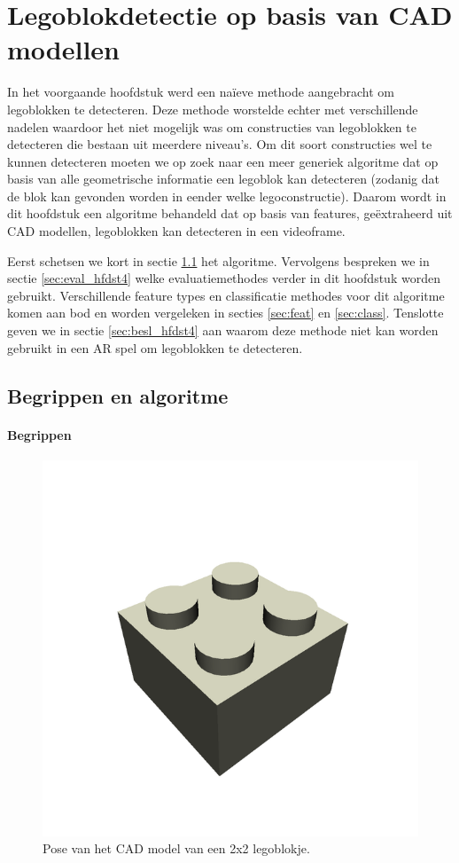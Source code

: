 \chapter{Legoblokdetectie op basis van CAD modellen}
\label{hoofdstuk:3}
In het voorgaande hoofdstuk werd een na\"ieve methode aangebracht om legoblokken te detecteren. Deze methode worstelde echter met verschillende nadelen waardoor het niet mogelijk was om constructies van legoblokken te detecteren die bestaan uit meerdere niveau's. Om dit soort constructies wel te kunnen detecteren moeten we op zoek naar een meer generiek algoritme dat op basis van alle geometrische informatie een legoblok kan detecteren (zodanig dat de blok kan gevonden worden in eender welke legoconstructie). Daarom wordt in dit hoofdstuk een algoritme behandeld dat op basis van features, ge\"extraheerd uit CAD modellen, legoblokken kan detecteren in een videoframe.

Eerst schetsen we kort in sectie \ref{sec:inl_hfdst4} het algoritme. Vervolgens bespreken we in sectie \ref{sec:eval_hfdst4} welke evaluatiemethodes verder in dit hoofdstuk worden gebruikt. Verschillende feature types en classificatie methodes voor dit algoritme komen aan bod en worden vergeleken in secties \ref{sec:feat} en \ref{sec:class}. Tenslotte geven we in sectie \ref{sec:besl_hfdst4} aan waarom deze methode niet kan worden gebruikt in een AR spel om legoblokken te detecteren.

\section{Begrippen en algoritme} \label{sec:inl_hfdst4}

\subsubsection*{Begrippen}

\begin{figure}
  \centering
  \includegraphics[width=.5\linewidth]{img/cad}
  \caption{Pose van het CAD model van een 2x2 legoblokje.}
  \label{fig:cad}
\end{figure}

